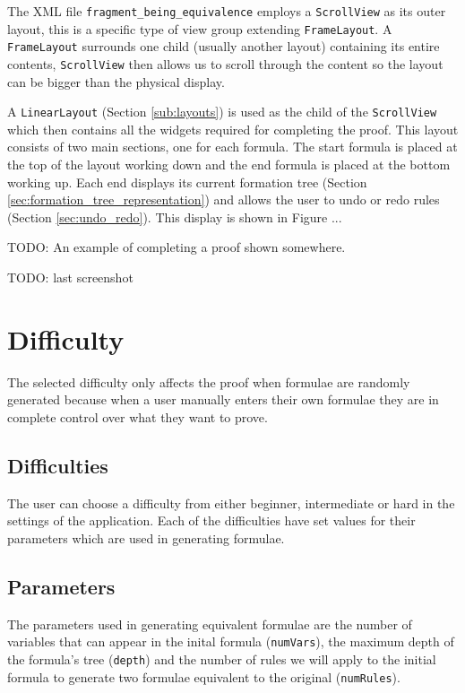 \documentclass{report}
\begin{document}
The XML file {\tt fragment\_being\_equivalence} employs a {\tt ScrollView} as its outer layout, this is a specific type of view group extending {\tt FrameLayout}. A {\tt FrameLayout} surrounds one child (usually another layout) containing its entire contents, {\tt ScrollView} then allows us to scroll through the content so the layout can be bigger than the physical display. 

A {\tt LinearLayout} (Section \ref{sub:layouts}) is used as the child of the {\tt ScrollView} which then contains all the widgets required for completing the proof. This layout consists of two main sections, one for each formula. The start formula is placed at the top of the layout working down and the end formula is placed at the bottom working up. Each end displays its current formation tree (Section \ref{sec:formation_tree_representation}) and allows the user to undo or redo rules (Section \ref{sec:undo_redo}). This display is shown in Figure ...

TODO: An example of completing a proof shown somewhere.

TODO: last screenshot
 
\section{Difficulty}
\label{sec:difficulty}

The selected difficulty only affects the proof when formulae are randomly generated because when a user manually enters their own formulae they are in complete control over what they want to prove.

\subsection{Difficulties}

The user can choose a difficulty from either beginner, intermediate or hard in the settings of the application. Each of the difficulties have set values for their parameters which are used in generating formulae. 

\subsection{Parameters}

The parameters used in generating equivalent formulae are the number of variables that can appear in the inital formula ({\tt numVars}), the maximum depth of the formula's tree ({\tt depth}) and the number of rules we will apply to the initial formula to generate two formulae equivalent to the original ({\tt numRules}).
\end{document}
